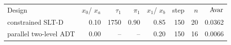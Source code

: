 \begin{tabular}{lrrrrrrr}
\toprule
Design & $x_0$/ $x_a$ & $\tau_1$ & $\pi_1$ & $x_1$/ $x_b$ & step & $n$ & $\mathrm{Avar}$ \\
constrained SLT-D & 0.10 & 1750 & 0.90 & 0.85 & 150 & 20 & 0.0362 \\
parallel two-level ADT & 0.00 & -- & -- & 0.20 & 150 & 16 & 0.0066 \\
\bottomrule
\end{tabular}
